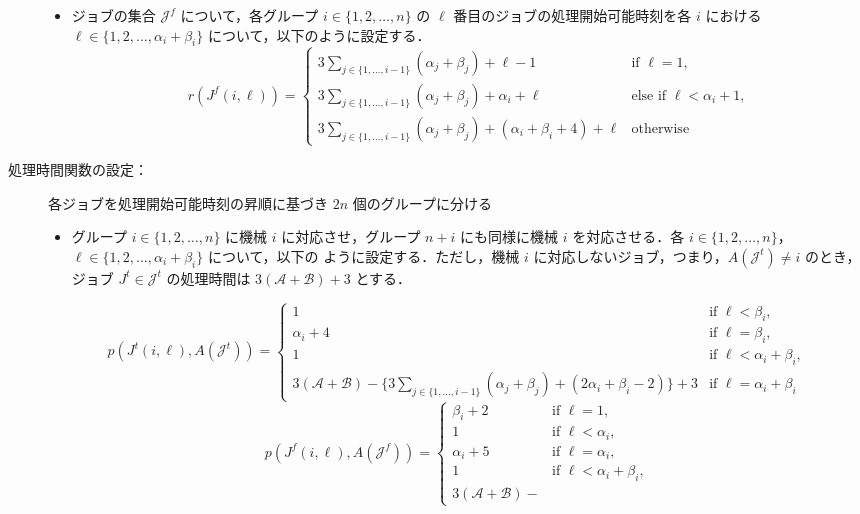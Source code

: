 \documentclass[12pt]{optlab-bachelor}
\begin{document}
\begin{description}
\begin{itemize}
    \item ジョブの集合 $\mathcal{J}^f$ について，各グループ $i \in \{1,2,\ldots, n\}$ の $\ell$ 番目のジョブの処理開始可能時刻を各 $i$ における $\ell \in \{1,2,\ldots,\alpha_i + \beta_i\}$ について，以下のように設定する．
    $$r(J^f(i,\ell)) =
    \left\{ \begin{array}{lll} 3 \displaystyle \sum_{j \in \{1,\ldots,i
    - 1\}}(\alpha_j + \beta_j) + \ell - 1 & \text{if } \ell = 1,
    \\ 3\displaystyle \sum_{j \in \{1,\ldots,i - 1\}}(\alpha_j + \beta_j) + \alpha_i + \ell  &
    \text{else if } \ell < \alpha_i + 1 , \\ 3\displaystyle \sum_{j \in \{1,\ldots,i - 1\}}(\alpha_j + \beta_j) + (\alpha_i + \beta_i + 4) + \ell & \text{otherwise} \end{array} \right.$$
  \end{itemize}
  \item[処理時間関数の設定：] 各ジョブを処理開始可能時刻の昇順に基づき $2n$ 個のグループに分ける
  \begin{itemize}
    \item グループ $i \in \{1,2,\ldots,n\}$ に機械 $i$ に対応させ，グループ
    $n + i$ にも同様に機械 $i$ を対応させる．各 $i \in \{1,2,\ldots,
    n\}$，$\ell \in \{1,2,\ldots, \alpha_i + \beta_i\}$ について，以下の
    ように設定する．ただし，機械 $i$ に対応しないジョブ，つまり，$A(\mathcal{J}^t)  \neq i$ のとき，ジョブ $J^t \in \mathcal{J}^t$ の処理時間は $3(\mathcal{A} + \mathcal{B}) + 3$ とする．
  \end{itemize}
  {\footnotesize
  $$p(J^t(i,\ell), A(\mathcal{J}^t)) =
  \left\{ \begin{array}{lllll} 1 & \text{if } \ell < \beta_i, \\
  \alpha_i + 4 & \text{if } \ell = \beta_i,\\ 1 & \text{if } \ell < \alpha_i + \beta_i, \\
  3(\mathcal{A} + \mathcal{B}) - \big\{ 3\displaystyle \sum_{j \in
  \{1,\ldots,i - 1\}}(\alpha_j + \beta_j) + (2\alpha_i +
  \beta_i - 2)\big \} + 3 & \text{if } \ell = \alpha_i +
  \beta_i \end{array} \right.$$
  }
  {\footnotesize
  $$p(J^f(i,\ell),A(\mathcal{J}^f)) = \left\{ \begin{array}{lllll}
  \beta_i + 2 & \text{if } \ell = 1, \\
  1 & \text{if } \ell < \alpha_i, \\ \alpha_i
  + 5 & \text{if } \ell = \alpha_i , \\ 1 & \text{if } \ell < \alpha_i + \beta_i, \\ 3(\mathcal{A} + \mathcal{B}) -

\end{array}$$}
\end{description}
\end{document}
